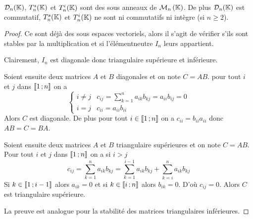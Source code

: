 \begin{prop}
  \(\mathcal{D}_n(\mathbb{K})\), \(T_n^s(\mathbb{K})\) et \(T_n^i(\mathbb{K})\) sont des sous anneaux de
  \(\mathcal{M}_{n}\left(\mathbb{K}\right)\). De plus \(\mathcal{D}_n(\mathbb{K})\) est commutatif, \(T_n^s(\mathbb{K})\) et
  \(T_n^i(\mathbb{K})\) ne sont ni commutatifs ni intègre (si \(n \geqslant 2\)).
\end{prop}
\begin{proof}
  Ce sont déjà des sous espaces vectoriels, alors il s'agit de vérifier s'ils
  sont stables par la multiplication et si l'élémentneutre \(I_n\) leurs
  appartient.

  Clairement, \(I_n\) est diagonale donc triangulaire supérieure et inférieure.

  Soient ensuite deux matrices \(A\) et \(B\) diagonales et on note \(C=AB\).
  pour tout \(i\) et \(j\) dans \(\mathopen{\llbracket}1\mathclose{}\mathpunct{};n\mathclose{\rrbracket}\) on a
  \begin{equation}
    \begin{cases}
      i \neq j & c_{ij} = \sum_{k=1}^n a_{ik}b_{kj}=a_{ii}b_{ij}=0 \\
      i=j & c_{ii}=a_{ii}b_{ii}
    \end{cases}
  \end{equation}
  Alors \(C\) est diagonale. De plus pour tout \(i \in \mathopen{\llbracket}1\mathclose{}\mathpunct{};n\mathclose{\rrbracket}\)
  on a \(c_{ii}=b_{ii}a_{ii}\) donc \(AB=C=BA\).

  Soient ensuite deux matrices \(A\) et \(B\) triangulaire supérieures et on
  note \(C=AB\). Pour tout \(i\) et \(j\) dans \(\mathopen{\llbracket}1\mathclose{}\mathpunct{};n\mathclose{\rrbracket}\) on a
  si \(i > j\)
  \begin{equation}
    c_{ij}=\sum_{k=1}^n a_{ik} b_{kj} = \sum_{k=1}^{i-1} a_{ik} b_{kj} +
    \sum_{k=i}^{n} a_{ik} b_{kj}
  \end{equation}
  Si \(k \in \mathopen{\llbracket}1\mathclose{}\mathpunct{};i-1\mathclose{\rrbracket}\) alors \(a_{ik}=0\) et si \(k \in
  \mathopen{\llbracket}i\mathclose{}\mathpunct{};n\mathclose{\rrbracket}\) alors \(b_{ik}=0\). D'où \(c_{ij}=0\). Alors \(C\)
  est triangulaire supérieure.

  La preuve est analogue pour la stabilité des matrices triangulaires
  inférieures.
\end{proof}

